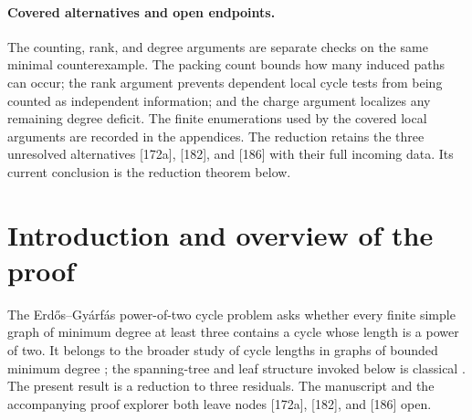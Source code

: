 \documentclass[11pt]{article}
\begin{document}
\paragraph{Covered alternatives and open endpoints.}
The counting, rank, and degree arguments are separate checks on the same
minimal counterexample.  The packing count bounds how many induced paths can
occur; the rank argument prevents dependent local cycle tests from being
counted as independent information; and the charge argument localizes any
remaining degree deficit.  The finite enumerations used by the covered local
arguments are recorded in the appendices.  The reduction retains the three
unresolved alternatives [172a], [182], and [186] with their full incoming
data.  Its current conclusion is the reduction theorem below.


\section{Introduction and overview of the proof}\label{sec:intro}

The Erd\H{o}s--Gy\'arf\'as power-of-two cycle problem asks whether every
finite simple graph of minimum degree at least three contains a cycle whose
length is a power of two.  It belongs to the broader study of cycle lengths
in graphs of bounded minimum degree \cite{BondyVince,GaoMa}; the spanning-tree
and leaf structure invoked below is classical \cite{KleitmanWest}.
The present result is a reduction to three residuals.  The manuscript and
the accompanying proof explorer both leave nodes [172a], [182], and [186]
open.
\end{document}
